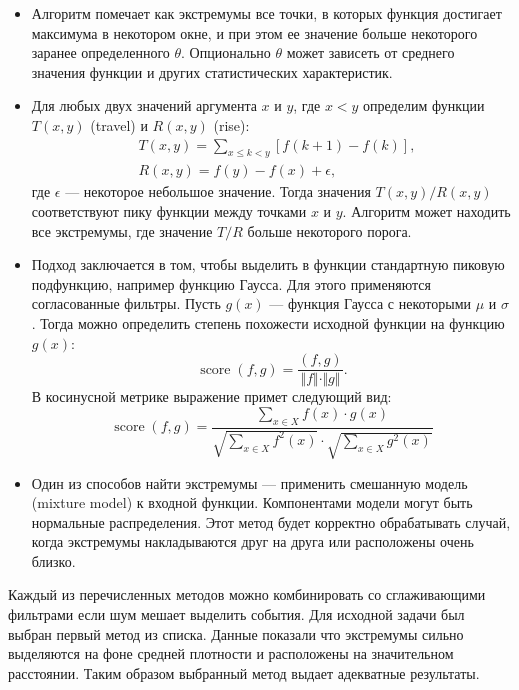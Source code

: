 \documentclass[12pt, a4paper]{article}
\DeclareMathOperator{\score}{score}
\begin{document}
  \begin{itemize}
	\item  
	Алгоритм помечает как экстремумы все точки, в которых функция достигает максимума в некотором окне, и при этом ее значение больше некоторого заранее определенного $\theta$. Опционально $\theta$ может зависеть от среднего значения функции и других статистических характеристик.
	\item
  	Для любых двух значений аргумента $x$ и $y$, где $x < y$ определим функции $T(x,y)$ (travel) и $R(x,y)$ (rise):
  	\begin{equation}
  	\begin{aligned}
	  	& T(x, y) = \sum_{x \leq k < y} \left[f(k + 1) - f(k)\right], \\
	  	& R(x, y) = f(y) - f(x) + \epsilon,
	\end{aligned}
  	\end{equation}
  	где $\epsilon$ --- некоторое небольшое значение. Тогда значения $T(x, y)/R(x, y)$ соответствуют пику функции между точками $x$ и $y$. Алгоритм может находить все экстремумы, где значение $T/R$ больше некоторого порога.
  	
  	\item
  	Подход заключается в том, чтобы выделить в функции стандартную пиковую подфункцию, например функцию Гаусса. Для этого применяются согласованные фильтры. Пусть $g(x)$ --- функция Гаусса с некоторыми $\mu$ и $\sigma$. Тогда можно определить степень похожести исходной функции на функцию $g(x)$:
  	\begin{equation}
  	\score(f,g) = \frac{\left(f,g\right)}{\Vert f \Vert \cdot \Vert g \Vert}.
  	\end{equation}
  	В косинусной метрике выражение примет следующий вид:
  	\begin{equation}
  	\score(f,g) = \frac{\sum\limits_{x \in X} f(x) \cdot g(x)}{\sqrt{\sum\limits_{x \in X}^{\,} f^2(x)} \cdot \sqrt{\sum\limits_{x \in X}^{\,} g^2(x)}}
  	\end{equation}

	\item
	Один из способов найти экстремумы --- применить смешанную модель (mixture model) к входной функции. Компонентами модели могут быть нормальные распределения. Этот метод будет корректно обрабатывать случай, когда экстремумы накладываются друг на друга или расположены очень близко.
  \end{itemize}
  
  Каждый из перечисленных методов можно комбинировать со сглаживающими фильтрами если шум мешает выделить события.
  Для исходной задачи был выбран первый метод из списка. Данные показали что экстремумы сильно выделяются на фоне средней плотности и расположены на значительном расстоянии. Таким образом выбранный метод выдает адекватные результаты.
  
\end{document}
